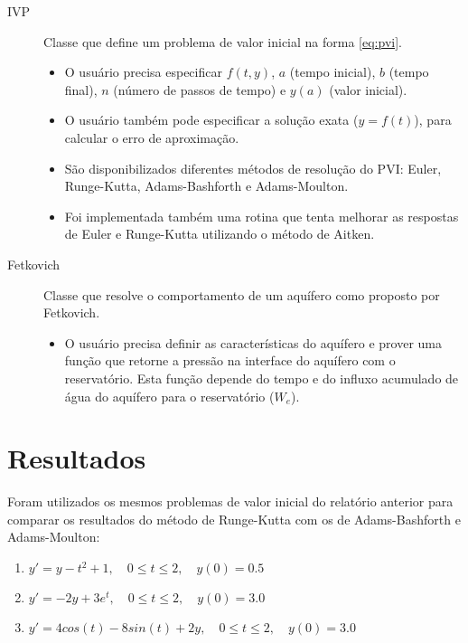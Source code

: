 \documentclass[final,5p]{elsarticle}
\numberwithin{equation}{section}
\begin{document}
        \begin{description}
            \item[IVP] Classe que define um problema de valor inicial na forma \ref{eq:pvi}.
            \begin{itemize}
                \item O usuário precisa especificar $f(t,y)$, $a$ (tempo inicial), $b$ (tempo final), $n$ (número de passos de tempo) e $y(a)$ (valor inicial).
                \item O usuário também pode especificar a solução exata ($y=f(t)$), para calcular o erro de aproximação.
                \item São disponibilizados diferentes métodos de resolução do PVI: Euler, Runge-Kutta, Adams-Bashforth e Adams-Moulton.
                \item Foi implementada também uma rotina que tenta melhorar as respostas de Euler e Runge-Kutta utilizando o método de Aitken.
            \end{itemize}
            \item[Fetkovich] Classe que resolve o comportamento de um aquífero como proposto por Fetkovich.
            \begin{itemize}
                \item O usuário precisa definir as características do aquífero e prover uma função que retorne a pressão na interface do aquífero com o reservatório. Esta função depende do tempo e do influxo acumulado de água do aquífero para o reservatório ($W_e$).
            \end{itemize}
        \end{description}

\section{Resultados}

        Foram utilizados os mesmos problemas de valor inicial do relatório anterior para comparar os resultados do método de Runge-Kutta com os de Adams-Bashforth e Adams-Moulton:

        \begin{enumerate}
            \item $y' = y - t^2 + 1, \quad 0 \leq t \leq  2, \quad y(0) = 0.5$ \label{item:pvi1}
            \item $y' = -2y + 3 e^t, \quad 0 \leq t \leq  2, \quad y(0) = 3.0$ \label{item:pvi2}
            \item $y' = 4 cos(t) - 8 sin(t) + 2 y, \quad 0 \leq t \leq  2, \quad y(0) = 3.0$ \label{item:pvi3}
        \end{enumerate}
\end{document}
